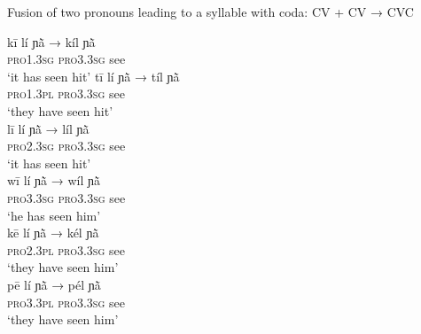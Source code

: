 \documentclass[output=paper]{langscibook}
\begin{document}
    \begin{exe}
        
        \ex Fusion of two pronouns leading to a syllable with coda:   CV + CV → CVC \label{ex:traore:40}
        \begin{xlist}
            \ex \gll kī              lí                  ɲã̀                →        kíl ɲã̀ \label{ex:traore:40a}\\ 
             \textsc{pro1.3sg}     \textsc{pro3.3sg}      see             {}          {}\\
             \trans `it has seen hit'
            \ex \gll tī               lí                  ɲã̀               →        tíl ɲã̀ \label{ex:traore:40b}\\ 
            \textsc{pro1.3pl}     \textsc{pro3.3sg}      see                 {}         {}\\
            \trans `they have seen hit'\\
            \ex \gll  lī                lí                  ɲã̀                →        líl  ɲã̀ \label{ex:traore:40c} \\
                \textsc{pro2.3sg}     \textsc{pro3.3sg}      see                {}  {}\\
                \trans `it has seen hit'\\
            \ex \gll wī              lí                  ɲã̀                →        wíl ɲã̀ \label{ex:traore:40d}\\
                \textsc{pro3.3sg}     \textsc{pro3.3sg}      see             {}         {}\\
                \trans `he has seen him'\\
            \ex \gll kē              lí                  ɲã̀                →        kél ɲã̀ \label{ex:traore:40e}\\
                \textsc{pro2.3pl}       \textsc{pro3.3sg}    see        {}      {}\\
                \trans `they have seen him'\\
            \ex \gll pē              lí                  ɲã̀                →        pél ɲã̀ \label{ex:traore:40f}\\
                \textsc{pro3.3pl}     \textsc{pro3.3sg}      see         {}     {}\\
                \trans `they have seen him'\\
        \end{xlist}
    \end{exe}
\end{document}
